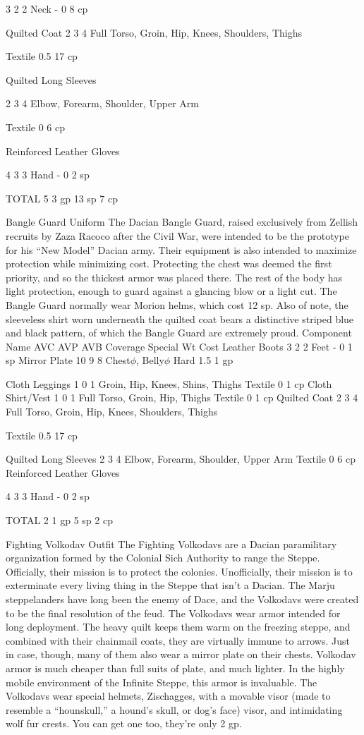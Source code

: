 \documentclass[oneside,11pt,english]{book}
\begin{document}
3 2 2 Neck - 0 8 cp 

Quilted Coat 2 3 4 Full Torso, Groin, Hip, Knees, 
Shoulders, Thighs 

Textile 0.5 17 
cp 

Quilted Long 
Sleeves 

2 3 4 Elbow, Forearm, Shoulder, 
Upper Arm 

Textile 0 6 cp 

Reinforced Leather 
Gloves 

4 3 3 Hand - 0 2 sp 

TOTAL 5 3 gp 
13 
sp 
7 cp 

 

Bangle Guard Uniform 
The Dacian Bangle Guard, raised exclusively from Zellish recruits by Zaza Racoco after the Civil War, 
were intended to be the prototype for his “New Model” Dacian army. Their equipment is also intended to 
maximize protection while minimizing cost. Protecting the chest was deemed the first priority, and so the 
thickest armor was placed there. The rest of the body has light protection, enough to guard against a 
glancing blow or a light cut. The Bangle Guard normally wear Morion helms, which cost 12 sp. 
Also of note, the sleeveless shirt worn underneath the quilted coat bears a distinctive striped blue and 
black pattern, of which the Bangle Guard are extremely proud. 
Component Name AVC AVP AVB Coverage Special Wt Cost 
Leather Boots 3 2 2 Feet - 0 1 sp 
Mirror Plate 10 9 8 Chest$\phi$, Belly$\phi$ Hard 1.5 1 gp 


Cloth Leggings 1 0 1 Groin, Hip, Knees, Shins, Thighs Textile 0 1 cp 
Cloth Shirt/Vest 1 0 1 Full Torso, Groin, Hip, Thighs Textile 0 1 cp 
Quilted Coat 2 3 4 Full Torso, Groin, Hip, Knees, Shoulders, 
Thighs 

Textile 0.5 17 cp 

Quilted Long Sleeves 2 3 4 Elbow, Forearm, Shoulder, Upper Arm Textile 0 6 cp 
Reinforced Leather 
Gloves 

4 3 3 Hand - 0 2 sp 

TOTAL 2 1 gp 
5 sp 
2 cp 
 

 

Fighting Volkodav Outfit 
The Fighting Volkodavs are a Dacian paramilitary organization formed by the Colonial Sich Authority to 
range the Steppe. Officially, their mission is to protect the colonies. Unofficially, their mission is to 
exterminate every living thing in the Steppe that isn't a Dacian. The Marju steppelanders have long been 
the enemy of Dace, and the Volkodavs were created to be the final resolution of the feud. The Volkodavs 
wear armor intended for long deployment. The heavy quilt keeps them warm on the freezing steppe, and 
combined with their chainmail coats, they are virtually immune to arrows. Just in case, though, many of 
them also wear a mirror plate on their chests. Volkodav armor is much cheaper than full suits of plate, and 
much lighter. In the highly mobile environment of the Infinite Steppe, this armor is invaluable. The 
Volkodavs wear special helmets, Zischagges, with a movable visor (made to resemble a “hounskull,” a 
hound's skull, or dog's face) visor, and intimidating wolf fur crests. You can get one too, they're only 2 gp. 
\end{document}
